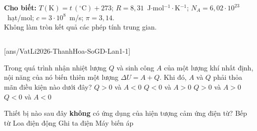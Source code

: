 \def\CheDo{solcolor}%
\def\tenchuong{Sở GD\&ĐT Thanh Hóa -- Lần 1}
\def\thuonghieu{VẬT LÍ 12 -- Eduzy.com.vn}
\def\TachCauDS{1}
\def\TachCauLG{1}




	\noindent\textbf{Cho biết:} ${T(\text{K})=t\,(^\circ\text{C})+273}$; ${R=8{,}31}$~J$\cdot$mol$^{-1}\cdot$K$^{-1}$; ${N_A=6{,}02\cdot 10^{23}}$~hạt/mol; ${c=3\cdot 10^8}$~m/s; ${\pi=3{,}14}$.\\
	Không làm tròn kết quả các phép tính trung gian.

	\noindent
	\subsection*{}
	\setcounter{ex}{0}
	[ans/VatLi2026-ThanhHoa-SoGD-Lan1-1]

	\begin{ex}%
		Trong quá trình nhận nhiệt lượng $Q$ và sinh công $A$ của một lượng khí nhất định, nội năng của nó biến thiên một lượng $\Delta U=A+Q$. Khi đó, $A$ và $Q$ phải thỏa mãn điều kiện nào dưới đây?
		\choice
		{\True $Q>0$ và $A<0$}
		{$Q<0$ và $A>0$}
		{$Q>0$ và $A>0$}
		{$Q<0$ và $A<0$}
	\end{ex}

	\begin{ex}%
		Thiết bị nào sau đây \textbf{không} có ứng dụng của hiện tượng cảm ứng điện từ?
		\choice
		{Bếp từ}
		{\True Loa điện động}
		{Ghi ta điện}
		{Máy biến áp}
	\end{ex}

